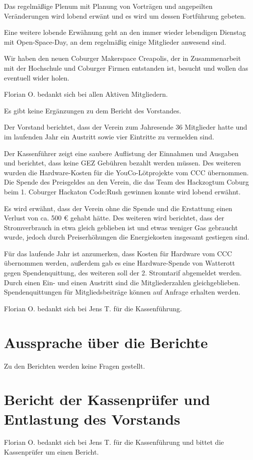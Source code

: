 Das regelmäßige Plenum mit Planung von Vorträgen und angepeilten Veränderungen wird lobend erwänt und es wird um dessen Fortführung gebeten.

Eine weitere lobende Erwähnung geht an den immer wieder lebendigen Dienstag mit Open-Space-Day, an dem regelmäßig einige Mitglieder anwesend sind.

Wir haben den neuen Coburger Makerspace Creapolis, der in Zusammenarbeit mit der Hochschule und Coburger Firmen entstanden ist, besucht und wollen das eventuell wider holen.

Florian O. bedankt sich bei allen Aktiven Mitgliedern.

Es gibt keine Ergänzungen zu dem Bericht des Vorstandes.

Der Vorstand berichtet, dass der Verein zum Jahresende 36 Mitglieder hatte und im laufenden Jahr ein Austritt sowie vier Eintritte zu vermelden sind.

Der Kassenführer zeigt eine saubere Auflistung der Einnahmen und Ausgaben und berichtet, dass keine GEZ Gebühren bezahlt werden müssen.
Des weiteren wurden die Hardware-Kosten für die YouCo-Lötprojekte vom CCC übernommen.
Die Spende des Preisgeldes an den Verein, die das Team des Hackzogtum Coburg beim 1. Coburger Hackaton Code:Rush gewinnen konnte wird lobend erwähnt.

Es wird erwähnt, dass der Verein ohne die Spende und die Erstattung einen Verlust von ca. 500 € gehabt hätte.
Des weiteren wird berichtet, dass der Stromverbrauch in etwa gleich geblieben ist und etwas weniger Gas gebraucht wurde, jedoch durch Preiserhöhungen die Energiekosten insgesamt gestiegen sind.

Für das laufende Jahr ist anzumerken, dass Kosten für Hardware vom CCC übernommen werden, außerdem gab es eine Hardware-Spende von Watterott gegen Spendenquittung, des weiteren soll der 2. Stromtarif abgemeldet werden. Durch einen Ein- und einen Austritt sind die Mitgliederzahlen gleichgeblieben. Spendenquittungen für Mitgliedsbeiträge können auf Anfrage erhalten werden.

Florian O. bedankt sich bei Jens T. für die Kassenführung.



\section{Aussprache über die Berichte}
Zu den Berichten werden keine Fragen gestellt.

\section{Bericht der Kassenprüfer und Entlastung des Vorstands}
Florian O. bedankt sich bei Jens T. für die Kassenführung und bittet die Kassenprüfer um einen Bericht.


